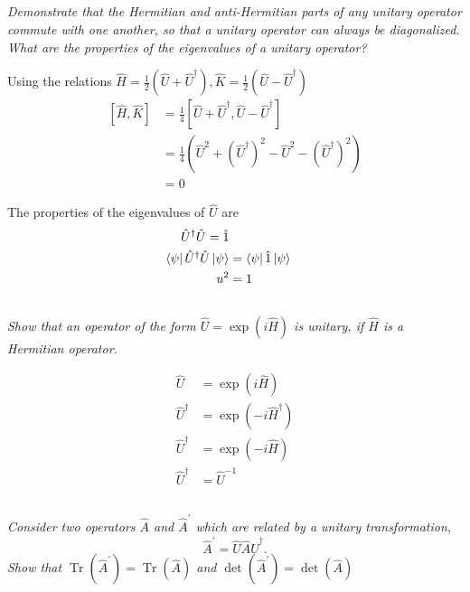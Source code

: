 \documentclass[12pt, letterpaper]{article}
\begin{document}
\subsection{}
\textit{Demonstrate that the Hermitian and anti-Hermitian parts of any unitary operator commute with one another, so that a unitary operator can always be diagonalized. What are the properties of the eigenvalues of a unitary operator?}

Using the relations $\hat H = \frac{1}{2} (\hat{U} + \hat{U}^\dagger),\hat K = \frac{1}{2} (\hat{U}  - \hat{ U}^\dagger)$
\begin{align*}
    \left[\hat H, \hat K \right] &= \frac{1}{4}\left[\hat{U} + \hat{U}^\dagger, \hat{U} - \hat{U}^\dagger\right]\\
    & = \frac{1}{4}\left(\hat{U}^2 + (\hat{U}^\dagger)^2 -  \hat{U}^2 - (\hat{U}^\dagger)^2 \right)\\
    &=0
\end{align*}

The properties of the eigenvalues of $\hat U$ are
\begin{align*}
    \hat{U}^\dagger \hat{U} = \hat 1\\
    \bra{\psi}\hat{U}^\dagger \hat{U}\ket{\psi} &= \bra{\psi}\hat 1 \ket{\psi}\\
    u^2 &=1
\end{align*}

\subsection{}
\textit{Show that an operator of the form $\hat{U}=\exp (i \hat{H})$ is unitary, if $\hat{H}$ is a Hermitian operator.}


\begin{align*}
    \hat{U} &=\exp (i \hat{H}) \\
    \hat{U}^\dagger &=\exp (-i \hat{H}^\dagger) \\
    \hat{U}^\dagger &=\exp (-i \hat{H}) \\
    \hat{U}^\dagger &=\hat{U}^{-1}
\end{align*}

\subsection{}
\textit{Consider two operators $\hat{A}$ and $\hat{A}^{\prime}$ which are related by a unitary transformation,} 
$$
\hat{A}^{\prime}=\hat{U} \hat{A} \hat{U}^{\dagger}.
$$
\textit{Show that $\operatorname{Tr}\left(\hat{A}^{\prime}\right)=\operatorname{Tr}(\hat{A})$ and $\operatorname{det}\left(\hat{A}^{\prime}\right)=\operatorname{det}(\hat{A})$}
\end{document}
